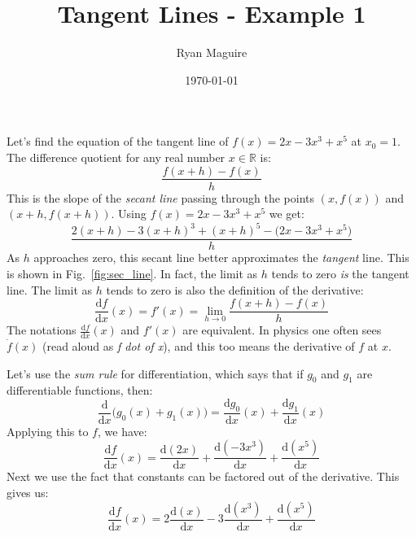 \documentclass{article}
\title{Tangent Lines - Example 1}
\author{Ryan Maguire}
\date{\today}
\begin{document}
    \maketitle
    Let's find the equation of the tangent line of
    $f(x)=2x-3x^{3}+x^{5}$ at $x_{0}=1$. The difference quotient for any real
    number $x\in\mathbb{R}$ is:
    \begin{equation}
        \frac{f(x+h)-f(x)}{h}
    \end{equation}
    This is the slope of the \textit{secant line} passing through the
    points $(x,f(x))$ and $(x+h,f(x+h))$. Using $f(x)=2x-3x^{3}+x^{5}$ we get:
    \begin{equation}
        \frac{2(x+h)-3(x+h)^{3}+(x+h)^{5}-\big(2x-3x^{3}+x^{5}\big)}{h}
    \end{equation}
    As $h$ approaches zero, this secant line better approximates the
    \textit{tangent} line. This is shown in
    Fig.~\ref{fig:sec_line}. In fact, the limit as $h$ tends to zero
    \textit{is} the tangent line. The limit as $h$ tends to zero is also the
    definition of the derivative:
    \begin{equation}
        \frac{\textrm{d}f}{\textrm{d}x}(x)
            =f'(x)
            =\lim_{h\rightarrow{0}}\frac{f(x+h)-f(x)}{h}
    \end{equation}
    The notations $\frac{\textrm{d}f}{\textrm{d}x}(x)$ and $f'(x)$ are
    equivalent. In physics one often sees $\dot{f}(x)$ (read aloud as
    \textit{f dot of x}), and this too means the derivative of $f$ at $x$.
    \par\hfill\par
    Let's use the \textit{sum rule} for differentiation, which says that if
    $g_{0}$ and $g_{1}$ are differentiable functions, then:
    \begin{equation}
        \frac{\textrm{d}}{\textrm{d}x}\big(g_{0}(x)+g_{1}(x)\big)
        =\frac{\textrm{d}g_{0}}{\textrm{d}x}(x)+
            \frac{\textrm{d}g_{1}}{\textrm{d}x}(x)
    \end{equation}
    Applying this to $f$, we have:
    \begin{equation}
        \frac{\textrm{d}f}{\textrm{d}x}(x)
        =\frac{\textrm{d}(2x)}{\textrm{d}x}+
        \frac{\textrm{d}(-3x^{3})}{\textrm{d}x}+
        \frac{\textrm{d}(x^{5})}{\textrm{d}x}
    \end{equation}
    Next we use the fact that constants can be factored out of the derivative.
    This gives us:
    \begin{equation}
        \frac{\textrm{d}f}{\textrm{d}x}(x)
        =2\frac{\textrm{d}(x)}{\textrm{d}x}-
        3\frac{\textrm{d}(x^{3})}{\textrm{d}x}+
        \frac{\textrm{d}(x^{5})}{\textrm{d}x}
    \end{equation}
\end{document}
